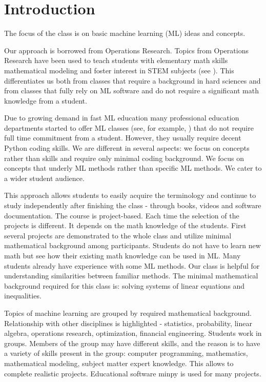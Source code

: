 \documentclass{article} %
\begin{document}
    \section{Introduction} %

The focus of the class is on basic machine learning (ML) ideas and concepts. 

Our approach is borrowed from Operations Research. Topics from Operations Research have been used to teach students with elementary math skills mathematical modeling and foster interest in STEM subjects (see \cite{RG}). This differentiates us both from classes that require a background in hard sciences and from classes that fully rely on ML software and do not require a significant math knowledge from a student.

Due to growing demand in fast ML education many professional education departments started to offer ML classes (see, for example, \cite{MITML,GMUML,UUML}) that do not require full time commitment from a student. However, they usually require decent Python coding skills. We are different in several aspects: we focus on concepts rather than skills and require only minimal coding background. We focus on concepts that underly ML methods rather than specific ML methods. We cater to a wider student audience.

This approach allows students to easily acquire the terminology and continue to study independently after finishing the class -  through books, videos  and software documentation.  The course is project-based. Each time the selection of the projects is different. It depends on the math knowledge of the students. First several projects are demonstrated to the whole class and utilize minimal mathematical background among participants. Students do not have to learn new math but see how their existing math knowledge can be used in ML.   Many students already have experience with some ML methods. Our class is helpful for understanding similarities between familiar methods.  The minimal mathematical background required for this class is: solving systems of linear equations and inequalities.

 Topics of machine learning are grouped by required mathematical background. Relationship with other disciplines is highlighted - statistics, probability, linear algebra, operations research, optimization, financial engineering. Students work in groups.  Members of the group may have different skills, and the reason is to have a variety of skills present in the group: computer programming, mathematics, mathematical modeling, subject matter expert knowledge. This allows to complete realistic projects. Educational software minpy is used for many projects.
\end{document}

